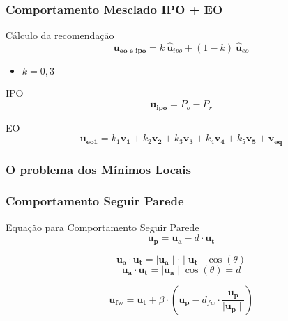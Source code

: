 \begin{frame}
	\frametitle{Comportamento Mesclado IPO + EO}
	\begin{block}{Cálculo da recomendação}
		\begin{equation}
			\mathbf{u_{eo\_e\_ipo}} = k \ \hat{\mathbf{u}}_{ipo} + (1-k) \ \hat{\mathbf{u}}_{eo}
		\end{equation}
		
		\pause
		\begin{itemize}
		  \item $k = 0,3$
		\end{itemize}
	\end{block}
	
	\pause
	\begin{exampleblock}{IPO}
		\begin{equation}
			\mathbf{u_{ipo}} = P_o - P_r
		\end{equation}
	\end{exampleblock}
	
	\pause
	\begin{block}{EO}
		\begin{equation}
			\mathbf{u_{eo1}} = k_1 \mathbf{v_1} + k_2 \mathbf{v_2} + k_3 \mathbf{v_3} + 
			k_4 \mathbf{v_4} + k_5 \mathbf{v_5} + \mathbf{v_{eq}}
		\end{equation}
	\end{block}
\end{frame}

\begin{frame}
	\frametitle{O problema dos Mínimos Locais}
	
\end{frame}

\begin{frame}
	\frametitle{Comportamento Seguir Parede}
	
\end{frame}

\begin{frame}
	
\end{frame}

\begin{frame}
	\begin{block}{Equação para Comportamento Seguir Parede}
		\begin{equation}
			\mathbf{u_p} = \mathbf{u_a} - d \cdot \mathbf{u_t}
		\end{equation}
		
		\pause
		\begin{equation}
			\mathbf{u_a} \cdot \mathbf{u_t} = \mid \mathbf{u_a} \mid \cdot \mid \mathbf{u_t} \mid \cos(\theta)
		\end{equation}
		\pause
		\begin{equation}
			\mathbf{u_a} \cdot \mathbf{u_t} = \mid \mathbf{u_a} \mid \cos(\theta) = d
		\end{equation}
		
		\pause
		\begin{equation}
			\mathbf{u_{fw}} = \mathbf{u_t} + \beta \cdot \left(\mathbf{u_p} - d_{fw} \cdot 
			\frac{\mathbf{u_p}}{\mid \mathbf{u_p} \mid}\right)
		\end{equation}
	\end{block}
\end{frame}

